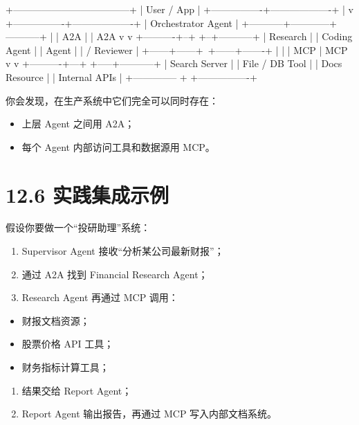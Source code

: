 \begin{codeblock}
                    +------------------------------------+
                    |            User / App              |
                    +----------------+-------------------+
                                     |
                                     v
                    +----------------+-------------------+
                    |        Orchestrator Agent          |
                    +-----------+------------+-----------+
                                |            |
                        A2A     |            |    A2A
                                v            v
                     +----------+--+      +--+-----------+
                     | Research    |      | Coding Agent |
                     | Agent       |      | / Reviewer   |
                     +------+------+\     +------+-------+
                            |             |
                            | MCP         | MCP
                            v             v
                 +----------+---+   +-----+-----------+
                 | Search Server |   | File / DB Tool |
                 | Docs Resource |   | Internal APIs  |
                 +-------------- +   +----------------+
\end{codeblock}

你会发现，在生产系统中它们完全可以同时存在：


\begin{itemize}[leftmargin=2em]
\item 上层 Agent 之间用 A2A；
\item 每个 Agent 内部访问工具和数据源用 MCP。
\end{itemize}

\section{12.6 实践集成示例}

假设你要做一个``投研助理''系统：


\begin{enumerate}[leftmargin=2em]
\item Supervisor Agent 接收``分析某公司最新财报''；
\item 通过 A2A 找到 Financial Research Agent；
\item Research Agent 再通过 MCP 调用：
\end{enumerate}
\begin{itemize}[leftmargin=2em]
\item 财报文档资源；
\item 股票价格 API 工具；
\item 财务指标计算工具；
\end{itemize}
\begin{enumerate}[leftmargin=2em]
\item 结果交给 Report Agent；
\item Report Agent 输出报告，再通过 MCP 写入内部文档系统。
\end{enumerate}

